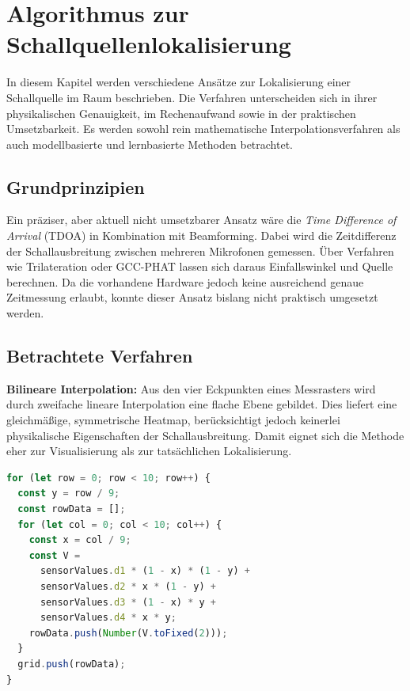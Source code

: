 \chapter{Algorithmus zur Schallquellenlokalisierung}
\label{cha:algorithmus_zur_schallquellenlokalisierung}

In diesem Kapitel werden verschiedene Ansätze zur Lokalisierung einer Schallquelle im Raum beschrieben. Die Verfahren unterscheiden sich in ihrer physikalischen Genauigkeit, im Rechenaufwand sowie in der praktischen Umsetzbarkeit. Es werden sowohl rein mathematische Interpolationsverfahren als auch modellbasierte und lernbasierte Methoden betrachtet.

\section{Grundprinzipien}

Ein präziser, aber aktuell nicht umsetzbarer Ansatz wäre die \textit{Time Difference of Arrival} (TDOA) in Kombination mit Beamforming. Dabei wird die Zeitdifferenz der Schallausbreitung zwischen mehreren Mikrofonen gemessen. Über Verfahren wie Trilateration oder GCC-PHAT lassen sich daraus Einfallswinkel und Quelle berechnen.  
Da die vorhandene Hardware jedoch keine ausreichend genaue Zeitmessung erlaubt, konnte dieser Ansatz bislang nicht praktisch umgesetzt werden.

\section{Betrachtete Verfahren}

\textbf{Bilineare Interpolation:}  
Aus den vier Eckpunkten eines Messrasters wird durch zweifache lineare Interpolation eine flache Ebene gebildet. Dies liefert eine gleichmäßige, symmetrische Heatmap, berücksichtigt jedoch keinerlei physikalische Eigenschaften der Schallausbreitung. Damit eignet sich die Methode eher zur Visualisierung als zur tatsächlichen Lokalisierung.
\begin{lstlisting}[language=JavaScript, caption={Bilineare Interpolation}]
for (let row = 0; row < 10; row++) {
  const y = row / 9;
  const rowData = [];
  for (let col = 0; col < 10; col++) {
    const x = col / 9;
    const V =
      sensorValues.d1 * (1 - x) * (1 - y) +
      sensorValues.d2 * x * (1 - y) +
      sensorValues.d3 * (1 - x) * y +
      sensorValues.d4 * x * y;
    rowData.push(Number(V.toFixed(2)));
  }
  grid.push(rowData);
}
\end{lstlisting}
\begin{minipage}[b]{0.5\textwidth}
\end{minipage}

